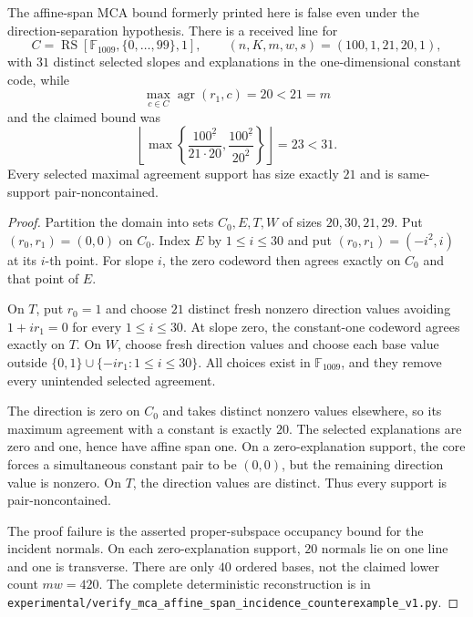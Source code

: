 \documentclass[11pt,a4paper]{amsart}
\numberwithin{equation}{section}
\theoremstyle{remark}
\DeclareMathOperator{\RS}{RS}\DeclareMathOperator{\MCA}{MCA}\DeclareMathOperator{\CA}{CA}
\newcommand{\F}{\mathbb F}\newcommand{\B}{\mathbb B}\newcommand{\K}{\mathbb K}\newcommand{\Z}{\mathbb Z}
\begin{document}
\begin{proposition}
\label{prop:affine-span-mca-counterexample}
The affine-span MCA bound formerly printed here is false even under the
direction-separation hypothesis.  There is a received line for
\[
 C=\RS[\F_{1009},\{0,\ldots,99\},1],
 \qquad (n,K,m,w,s)=(100,1,21,20,1),
\]
with \(31\) distinct selected slopes and explanations in the
one-dimensional constant code, while
\[
 \max_{c\in C}\operatorname{agr}(r_1,c)=20<21=m
\]
and the claimed bound was
\[
 \left\lfloor
 \max\left\{
 \frac{100^{\underline2}}{21\cdot20},
 \frac{100^{\underline2}}{20^{\overline2}}
 \right\}
 \right\rfloor=23<31.
\]
Every selected maximal agreement support has size exactly \(21\) and is
same-support pair-noncontained.
\end{proposition}

\begin{proof}
Partition the domain into sets \(C_0,E,T,W\) of sizes \(20,30,21,29\).
Put \((r_0,r_1)=(0,0)\) on \(C_0\).  Index \(E\) by
\(1\le i\le30\) and put \((r_0,r_1)=(-i^2,i)\) at its \(i\)-th point.
For slope \(i\), the zero codeword then agrees exactly on \(C_0\) and
that point of \(E\).

On \(T\), put \(r_0=1\) and choose \(21\) distinct fresh nonzero direction
values avoiding \(1+i r_1=0\) for every \(1\le i\le30\).  At slope zero,
the constant-one codeword agrees exactly on \(T\).  On \(W\), choose fresh
direction values and choose each base value outside
\(\{0,1\}\cup\{-i r_1:1\le i\le30\}\).  All choices exist in
\(\F_{1009}\), and they remove every unintended selected agreement.

The direction is zero on \(C_0\) and takes distinct nonzero values elsewhere,
so its maximum agreement with a constant is exactly \(20\).  The selected
explanations are zero and one, hence have affine span one.  On a
zero-explanation support, the core forces a simultaneous constant pair to be
\((0,0)\), but the remaining direction value is nonzero.  On \(T\), the
direction values are distinct.  Thus every support is pair-noncontained.

The proof failure is the asserted proper-subspace occupancy bound for the
incident normals.  On each zero-explanation support, \(20\) normals lie on
one line and one is transverse.  There are only \(40\) ordered bases, not the
claimed lower count \(m w=420\).  The complete deterministic reconstruction
is in
\texttt{experimental/verify\_mca\_affine\_span\_incidence\_counterexample\_v1.py}.
\end{proof}
\end{document}
